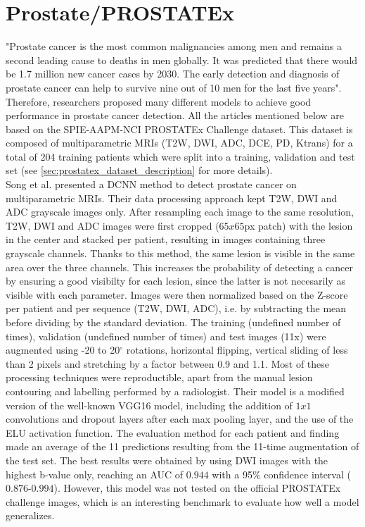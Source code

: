 \section{Prostate/PROSTATEx}
"Prostate  cancer  is  the  most  common  malignancies  among  men  and  remains  a  second  leading  cause to deaths in men globally. It was predicted that there would be 1.7 million new cancer cases by 2030. The early detection and diagnosis of prostate cancer can help to survive nine out of 10 men for the last five years"\cite{41}. Therefore, researchers proposed many different models to achieve good performance in prostate cancer detection. All the articles mentioned below are based on the SPIE-AAPM-NCI PROSTATEx Challenge dataset. This dataset is composed of multiparametric MRIs (T2W, DWI, ADC, DCE, PD, Ktrans) for a total of 204 training patients which were split into a training, validation and test set (see \ref{sec:prostatex_dataset_description} for more details).\\
Song et al. \cite{07} presented a DCNN method to detect prostate cancer on multiparametric MRIs. Their data processing approach kept T2W, DWI and ADC grayscale images only. After resampling each image to the same resolution, T2W, DWI and ADC images were first cropped ($65x65$px patch) with the lesion in the center and stacked per patient, resulting in images containing three grayscale channels. Thanks to this method, the same lesion is visible in the same area over the three channels. This increases the probability of detecting a cancer by ensuring a good visibilty for each lesion, since the latter is not necesarily as visible with each parameter. Images were then normalized based on the Z-score per patient and per sequence (T2W, DWI, ADC), i.e. by subtracting the mean before dividing by the standard deviation. The training (undefined number of times), validation (undefined number of times) and test images (11x) were augmented using -20 to 20$^\circ$ rotations, horizontal flipping, vertical sliding of less than 2 pixels and stretching by a factor between 0.9 and 1.1. Most of these processing techniques were reproductible, apart from the manual lesion contouring and labelling performed by a radiologist. 
Their model is a modified version of the well-known VGG16 model, including the addition of $1x1$ convolutions and dropout layers after each max pooling layer, and the use of the ELU activation function. The evaluation method for each patient and finding made an average of the 11 predictions resulting from the 11-time augmentation of the test set. The best results were obtained by using DWI images with the highest b-value only, reaching an AUC of $0.944$ with a 95$\%$ confidence interval ($0.876$-$0.994$). However, this model was not tested on the official PROSTATEx challenge images, which is an interesting benchmark to evaluate how well a model generalizes.

